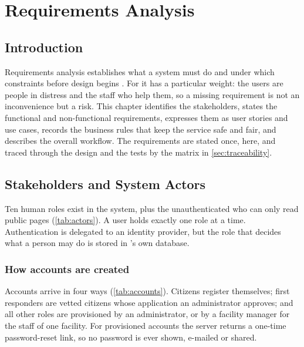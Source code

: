\chapter{Requirements Analysis}\label{chap:requirements}

\section{Introduction}

Requirements analysis establishes what a system must do and under which constraints before design begins
\cite{pressman2020se,sommerville2016software}. For \ProjectName{} it has a particular weight: the users are people
in distress and the staff who help them, so a missing requirement is not an inconvenience but a risk. This chapter
identifies the stakeholders, states the functional and non-functional requirements, expresses them as user
stories and use cases, records the business rules that keep the service safe and fair, and describes the overall
workflow. The requirements are stated once, here, and traced through the design and the tests by the matrix in
\cref{sec:traceability}.

\section{Stakeholders and System Actors}

Ten human roles exist in the system, plus the unauthenticated  who can only read public pages
(\cref{tab:actors}). A user holds exactly one role at a time. Authentication is delegated to an identity provider,
but the role that decides what a person may do is stored in \ProjectName{}'s own database.



\subsection{How accounts are created}

Accounts arrive in four ways (\cref{tab:accounts}). Citizens register themselves; first responders are vetted
citizens whose application an administrator approves; and all other roles are provisioned by an administrator, or
by a facility manager for the staff of one facility. For provisioned accounts the server returns a one-time
password-reset link, so no password is ever shown, e-mailed or shared.



